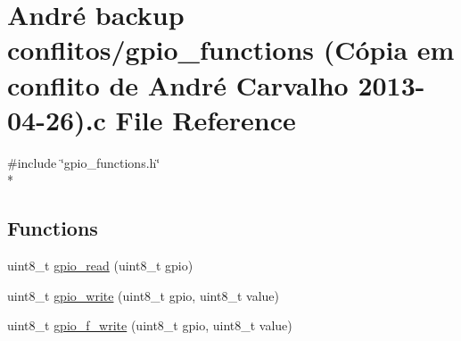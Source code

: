 \hypertarget{gpio__functions_01_07C_xC3_xB3pia_01em_01conflito_01de_01Andr_xC3_xA9_01Carvalho_012013-04-26_08_8c}{\section{André backup conflitos/gpio\-\_\-functions (Cópia em conflito de André Carvalho 2013-\/04-\/26).c File Reference}
\label{gpio__functions_01_07C_xC3_xB3pia_01em_01conflito_01de_01Andr_xC3_xA9_01Carvalho_012013-04-26_08_8c}
}
{\ttfamily \#include \char`\"{}gpio\-\_\-functions.\-h\char`\"{}}\\*
\subsection*{Functions}
\begin{DoxyCompactItemize}
\item 
uint8\-\_\-t \hyperlink{gpio__functions_01_07C_xC3_xB3pia_01em_01conflito_01de_01Andr_xC3_xA9_01Carvalho_012013-04-26_08_8c_a267fb0bb66584f91d79ef9e1dc75c997}{gpio\-\_\-read} (uint8\-\_\-t gpio)
\item 
uint8\-\_\-t \hyperlink{gpio__functions_01_07C_xC3_xB3pia_01em_01conflito_01de_01Andr_xC3_xA9_01Carvalho_012013-04-26_08_8c_a9e6c28fef76e43333120a91d47d44f9f}{gpio\-\_\-write} (uint8\-\_\-t gpio, uint8\-\_\-t value)
\item 
uint8\-\_\-t \hyperlink{gpio__functions_01_07C_xC3_xB3pia_01em_01conflito_01de_01Andr_xC3_xA9_01Carvalho_012013-04-26_08_8c_a5ba85b445f40e170abf99251cae63ef2}{gpio\-\_\-f\-\_\-write} (uint8\-\_\-t gpio, uint8\-\_\-t value)
\end{DoxyCompactItemize}


